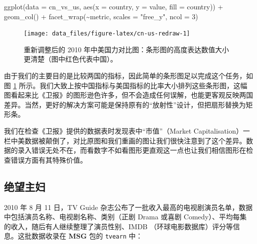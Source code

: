 \documentclass[
  b5paper,
  UTF8,twoside]{book}
\newenvironment{Shaded}{\begin{snugshade}}{\end{snugshade}}
\newcommand{\AttributeTok}[1]{\textcolor[rgb]{0.77,0.63,0.00}{#1}}
\newcommand{\CommentTok}[1]{\textcolor[rgb]{0.56,0.35,0.01}{\textit{#1}}}
\newcommand{\ConstantTok}[1]{\textcolor[rgb]{0.00,0.00,0.00}{#1}}
\newcommand{\DecValTok}[1]{\textcolor[rgb]{0.00,0.00,0.81}{#1}}
\newcommand{\FunctionTok}[1]{\textcolor[rgb]{0.00,0.00,0.00}{#1}}
\newcommand{\NormalTok}[1]{#1}
\newcommand{\SpecialCharTok}[1]{\textcolor[rgb]{0.00,0.00,0.00}{#1}}
\newcommand{\StringTok}[1]{\textcolor[rgb]{0.31,0.60,0.02}{#1}}
\begin{document}
\begin{Shaded}
\begin{Highlighting}[]
\FunctionTok{ggplot}\NormalTok{(}\AttributeTok{data =}\NormalTok{ cn\_vs\_us, }\FunctionTok{aes}\NormalTok{(}\AttributeTok{x =}\NormalTok{ country, }\AttributeTok{y =}\NormalTok{ value, }\AttributeTok{fill =}\NormalTok{ country)) }\SpecialCharTok{+}
  \FunctionTok{geom\_col}\NormalTok{() }\SpecialCharTok{+}
  \FunctionTok{facet\_wrap}\NormalTok{(}\SpecialCharTok{\textasciitilde{}}\NormalTok{metric, }\AttributeTok{scales =} \StringTok{"free\_y"}\NormalTok{, }\AttributeTok{ncol =} \DecValTok{3}\NormalTok{)}
\end{Highlighting}
\end{Shaded}

\begin{figure}

{\centering \texttt{[image: data\_files/figure-latex/cn-us-redraw-1]} 

}

\caption[2010 年中美国力对比条形图]{重新调整后的 2010 年中美国力对比图：条形图的高度表达数值大小更清楚（图中红色代表中国）。}\label{fig:cn-us-redraw}
\end{figure}



由于我们的主要目的是比较两国的指标，因此简单的条形图足以完成这个任务，如图 \ref{fig:cn-us-redraw} 所示。我们大致上按中国指标与美国指标的比率大小排列这些条形图，这幅图看起来比《卫报》的图形逊色许多，但不会造成任何误解，也能更客观反映两国差异。当然，更好的解决方案可能是保持原有的``放射性''设计，但把扇形替换为矩形条。

我们在检查《卫报》提供的数据表时发现表中``市值''（Market Capitalisation）一栏中美数据被颠倒了，对比原图和我们重画的图让我们很快注意到了这个差异。数据的录入错误无处不在，而看数字不如看图形更直观这一点也让我们相信图形在检查错误方面有其特殊价值。

\hypertarget{subsec:tvearn}{%
\subsection{绝望主妇}\label{subsec:tvearn}}

2010 年 8 月 11 日，TV Guide 杂志公布了一批收入最高的电视剧演员名单，数据中包括演员名称、电视剧名称、类别（正剧 Drama 或喜剧 Comedy）、平均每集的收入，随后有人继续整理了演员性别、IMDB （环球电影数据库）评分等信息。这批数据收录在 \textbf{MSG} 包的 \texttt{tvearn} 中：

\begin{Shaded}
\end{Shaded}
\end{document}
